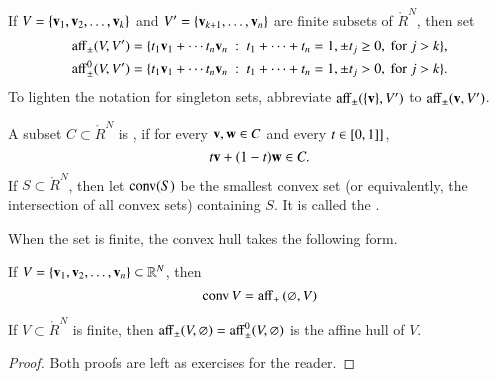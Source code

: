 \begin{definition}[affine]\label{def:aff} 
  If $V = \{{\mathbf v}_1,{\mathbf v}_2,\ldots,{\mathbf v}_k\}$ and $V'=\{{\mathbf v}_{k+1},\ldots,{\mathbf v}_n\}$
  are finite subsets of $\ring{R}^N$, then set
	\begin{align*}
{\operatorname{aff}}_{\pm} (V,V') &= \{t_1 {\mathbf v}_1 +\cdots t_n {\mathbf v}_n \ :\ 
	t_1 +\cdots+t_n = 1, \pm t_j \ge 0, \text{ for } j>k\},\\
{\operatorname{aff}}^0_{\pm} (V,V') &= \{t_1 {\mathbf v}_1 +\cdots t_n {\mathbf v}_n \ :\ 
	t_1 +\cdots+t_n = 1, \pm t_j > 0, \text{ for } j>k\}.
		\end{align*}
To lighten the notation for singleton sets, abbreviate
${\operatorname{aff}}_\pm(\{{\mathbf v}\},V')$ to ${\operatorname{aff}}_\pm({\mathbf v},V')$.
%
%
%
%
%
\end{definition}



\begin{definition}
A subset $C\subset\ring{R}^N$ is , if for
every ${\mathbf v},{\mathbf w}\in C$ and every $t \in [0,1]]$,
\[ 
t {\mathbf v} + (1-t) {\mathbf w} \in C.
\] 
If $S\subset\ring{R}^N$, then let ${\operatorname{conv}}(S)$ be the smallest convex set
(or equivalently, the intersection of all convex sets)
containing $S$.  It is called the .
\end{definition}

When the set is finite, the convex hull takes the following form.

\begin{lemma}[]
If $V = \{{\mathbf v}_1,{\mathbf v}_2,\ldots,{\mathbf v}_n\}\subset\mathbb{R}^N$, then
	\[ 
{\operatorname{conv}}\, V = {\operatorname{aff}}_+\, (\varnothing,V)
\] 
%
%
\end{lemma}

\begin{lemma}[]
If $V\subset\ring{R}^N$ is finite, then
${\operatorname{aff}}_\pm (V,\varnothing) = {\operatorname{aff}}^0_\pm(V,\varnothing)$
is the affine hull of $V$.
\end{lemma}

\begin{proof}  Both proofs are left as  exercises for the reader.
\end{proof}


